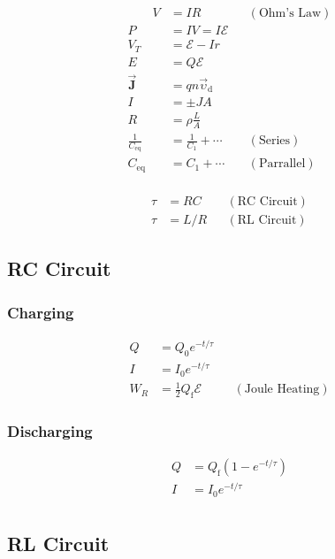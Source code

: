 \documentclass[10pt]{article}
\newcommand{\bvec}[1]{\vec{\mathbf{#1}}}
\begin{document}
\begin{multicols*}{5}
\begin{align*}
    \hspace{2em} V &= IR && (\text{Ohm's Law})\\
    P &= IV = I \mathcal{E}\\
    V_T &= \mathcal{E} - Ir\\
    E &= Q \mathcal{E}\\
    \bvec{J} &= qn\vec{\upsilon}_\mathrm{d}\\
    I &= \pm JA\\
    R &= \rho \frac{L}{A}\\
    \frac{1}{C_{\text{eq}}} &= \frac{1}{C_1} + \cdots &&
    (\text{Series})\\
    C_{\text{eq}} &= C_1 + \cdots && (\text{Parrallel})\\
\end{align*}

\begin{align*}
    \tau &= RC && (\text{RC Circuit})\\
    \tau &= L/R && (\text{RL Circuit})
\end{align*}

\subsection{RC Circuit}
\subsubsection{Charging}

\begin{align*}
    Q &= Q_0 e^{-t/\tau}\\
    I &= I_0 e^{-t/\tau}\\
    W_R &= \frac{1}{2} Q_\mathrm{f} \mathcal{E} && (\text{Joule
	Heating})
\end{align*}

\subsubsection{Discharging}

\begin{align*}
    Q &= Q_\mathrm{f} \left({1 - e^{-t/\tau}}\right)\\
    I &= I_0 e^{-t/\tau}\\
\end{align*}

\subsection{RL Circuit}


\end{multicols*}
\end{document}
